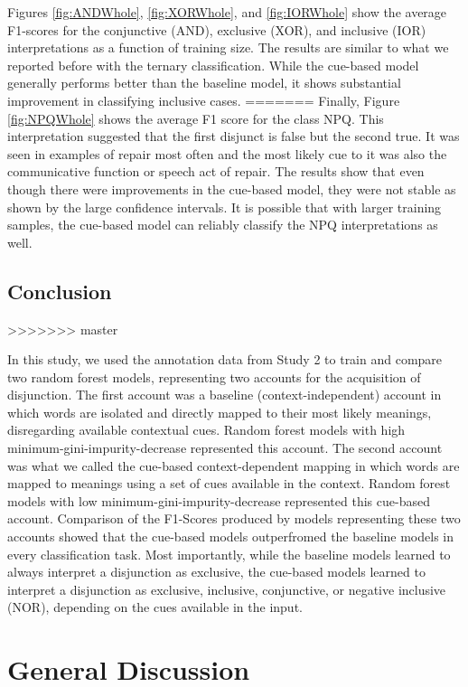 \documentclass[,man,floatsintext]{apa6}
\begin{document}
Figures \ref{fig:ANDWhole}, \ref{fig:XORWhole}, and \ref{fig:IORWhole} show the average F1-scores for the conjunctive (AND), exclusive (XOR), and inclusive (IOR) interpretations as a function of training size. The results are similar to what we reported before with the ternary classification. While the cue-based model generally performs better than the baseline model, it shows substantial improvement in classifying inclusive cases.
=======
Finally, Figure \ref{fig:NPQWhole} shows the average F1 score for the class NPQ. This interpretation suggested that the first disjunct is false but the second true. It was seen in examples of repair most often and the most likely cue to it was also the communicative function or speech act of repair. The results show that even though there were improvements in the cue-based model, they were not stable as shown by the large confidence intervals. It is possible that with larger training samples, the cue-based model can reliably classify the NPQ interpretations as well.

\hypertarget{conclusion-1}{%
\subsection{Conclusion}\label{conclusion-1}}
>>>>>>> master

In this study, we used the annotation data from Study 2 to train and compare two random forest models, representing two accounts for the acquisition of disjunction. The first account was a baseline (context-independent) account in which words are isolated and directly mapped to their most likely meanings, disregarding available contextual cues. Random forest models with high minimum-gini-impurity-decrease represented this account. The second account was what we called the cue-based context-dependent mapping in which words are mapped to meanings using a set of cues available in the context. Random forest models with low minimum-gini-impurity-decrease represented this cue-based account. Comparison of the F1-Scores produced by models representing these two accounts showed that the cue-based models outperfromed the baseline models in every classification task. Most importantly, while the baseline models learned to always interpret a disjunction as exclusive, the cue-based models learned to interpret a disjunction as exclusive, inclusive, conjunctive, or negative inclusive (NOR), depending on the cues available in the input.

\hypertarget{general-discussion}{%
\section{General Discussion}\label{general-discussion}}
\end{document}
